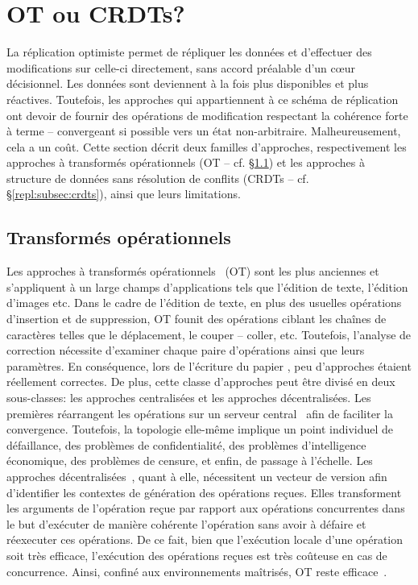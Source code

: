 
\section{OT ou CRDTs?}
\label{repl:sec:otorcrdts}

La réplication optimiste permet de répliquer les données et d'effectuer des
modifications sur celle-ci directement, sans accord préalable d'un cœur
décisionnel. Les données sont deviennent à la fois plus disponibles et plus
réactives. Toutefois, les approches qui appartiennent à ce schéma de réplication
ont devoir de fournir des opérations de modification respectant la cohérence
forte à terme -- convergeant si possible vers un état
non-arbitraire. Malheureusement, cela a un coût. Cette section décrit deux
familles d'approches, respectivement les approches à transformés opérationnels
(OT -- cf. §\ref{repl:subsec:ot}) et les approches à structure de données sans
résolution de conflits (CRDTs -- cf. §\ref{repl:subsec:crdts}), ainsi que leurs
limitations.

\subsection{Transformés opérationnels}
\label{repl:subsec:ot}

Les approches à transformés opérationnels~\cite{sun1998operational,
  sun2009contextbased} (OT) sont les plus anciennes et s'appliquent à un large
champs d'applications tels que l'édition de texte, l'édition d'images etc. Dans
le cadre de l'édition de texte, en plus des usuelles opérations d'insertion et
de suppression, OT founit des opérations ciblant les chaînes de caractères
telles que le déplacement, le couper -- coller, etc. Toutefois, l'analyse de
correction nécessite d'examiner chaque paire d'opérations ainsi que leurs
paramètres. En conséquence, lors de l'écriture du papier
\cite{imine2003proving}, peu d'approches étaient réellement correctes. De plus,
cette classe d'approches peut être divisé en deux sous-classes: les approches
centralisées et les approches décentralisées. Les premières réarrangent les
opérations sur un serveur central~\cite{nichols1995high} afin de faciliter la
convergence. Toutefois, la topologie elle-même implique un point individuel de
défaillance, des problèmes de confidentialité, des problèmes d'intelligence
économique, des problèmes de censure, et enfin, de passage à l'échelle. Les
approches décentralisées~\cite{sun2009contextbased}, quant à elle, nécessitent
un vecteur de version afin d'identifier les contextes de génération des
opérations reçues. Elles transforment les arguments de l'opération reçue par
rapport aux opérations concurrentes dans le but d'exécuter de manière cohérente
l'opération sans avoir à défaire et réexecuter ces opérations. De ce fait, bien
que l'exécution locale d'une opération soit très efficace, l'exécution des
opérations reçues est très coûteuse en cas de concurrence. Ainsi, confiné aux
environnements maîtrisés, OT reste efficace~\cite{mehdi2014merging}.


